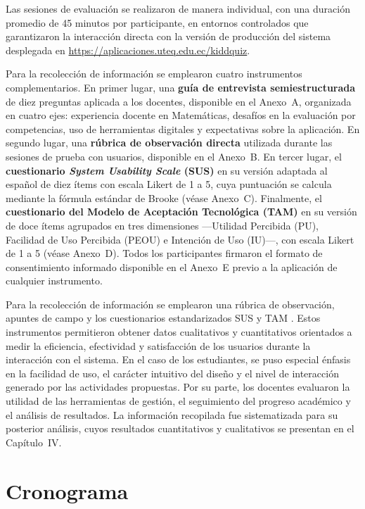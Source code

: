 Las sesiones de evaluación se realizaron de manera individual, con una duración promedio de 45 minutos por participante, en entornos controlados que garantizaron la interacción directa con la versión de producción del sistema desplegada en \url{https://aplicaciones.uteq.edu.ec/kiddquiz}.

Para la recolección de información se emplearon cuatro instrumentos complementarios. En primer lugar, una \textbf{guía de entrevista semiestructurada} de diez preguntas aplicada a los docentes, disponible en el Anexo~A, organizada en cuatro ejes: experiencia docente en Matemáticas, desafíos en la evaluación por competencias, uso de herramientas digitales y expectativas sobre la aplicación. En segundo lugar, una \textbf{rúbrica de observación directa} utilizada durante las sesiones de prueba con usuarios, disponible en el Anexo~B. En tercer lugar, el \textbf{cuestionario \textit{System Usability Scale} (SUS)} en su versión adaptada al español de diez ítems con escala Likert de 1 a 5, cuya puntuación se calcula mediante la fórmula estándar de Brooke \cite{brooke1996sus} (véase Anexo~C). Finalmente, el \textbf{cuestionario del Modelo de Aceptación Tecnológica (TAM)} en su versión de doce ítems agrupados en tres dimensiones ---Utilidad Percibida (PU), Facilidad de Uso Percibida (PEOU) e Intención de Uso (IU)---, con escala Likert de 1 a 5 \cite{davis1989tam} (véase Anexo~D). Todos los participantes firmaron el formato de consentimiento informado disponible en el Anexo~E previo a la aplicación
de cualquier instrumento.

Para la recolección de información se emplearon una rúbrica de observación, apuntes de campo y los cuestionarios estandarizados SUS y TAM \cite{brooke1996sus,davis1989tam}. Estos instrumentos permitieron obtener datos cualitativos y cuantitativos orientados a medir la eficiencia, efectividad y satisfacción de los usuarios durante la interacción con el sistema. En el caso de los estudiantes, se puso especial énfasis en la facilidad de uso, el carácter intuitivo del diseño y el nivel de interacción generado por las actividades propuestas. Por su parte, los docentes evaluaron la utilidad de las herramientas de gestión, el seguimiento del progreso académico y el análisis de resultados. La información recopilada fue sistematizada para su posterior análisis, cuyos resultados cuantitativos y cualitativos se presentan en el Capítulo~IV.

\section{Cronograma}

